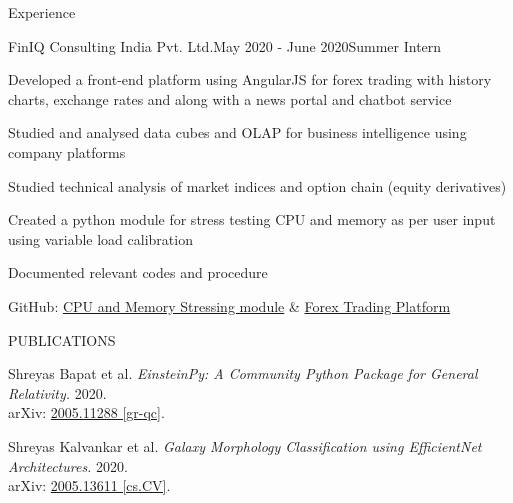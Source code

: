 \documentclass{resume} %
\begin{document}
\smallskip
\smallskip
\smallskip
\begin{rSection}{Experience}

\begin{rSubsection}{FinIQ Consulting India Pvt. Ltd.}{May 2020 - June 2020}{Summer Intern}{}
\item Developed a front-end platform using AngularJS for forex trading with history charts, exchange rates and along with a news portal and chatbot service
\item Studied and analysed data cubes and OLAP for business intelligence using company platforms
\item Studied technical analysis of market indices and option chain (equity derivatives)
\item Created a python module for stress testing CPU and memory as per user input using variable load calibration
\item Documented relevant codes and procedure
\item GitHub: \href{https://github.com/obi-wan-shinobi/Stress-test}{CPU and Memory Stressing module} \& \href{https://github.com/obi-wan-shinobi/Forex-Trading}{Forex Trading Platform}
\end{rSubsection}


\end{rSection}
\smallskip
\smallskip
\smallskip

\begin{rSection}{PUBLICATIONS}
\item Shreyas Bapat et al. \textit{EinsteinPy: A Community Python Package for General Relativity.} 2020.\\ arXiv: \href{https://arxiv.org/abs/2005.11288}{2005.11288 [gr-qc]}.

\item Shreyas Kalvankar et al. \textit{Galaxy Morphology Classification using EfficientNet Architectures.} 2020.\\ arXiv:
\href{https://arxiv.org/abs/2008.13611}{2005.13611 [cs.CV]}.

\end{rSection}
\end{document}
